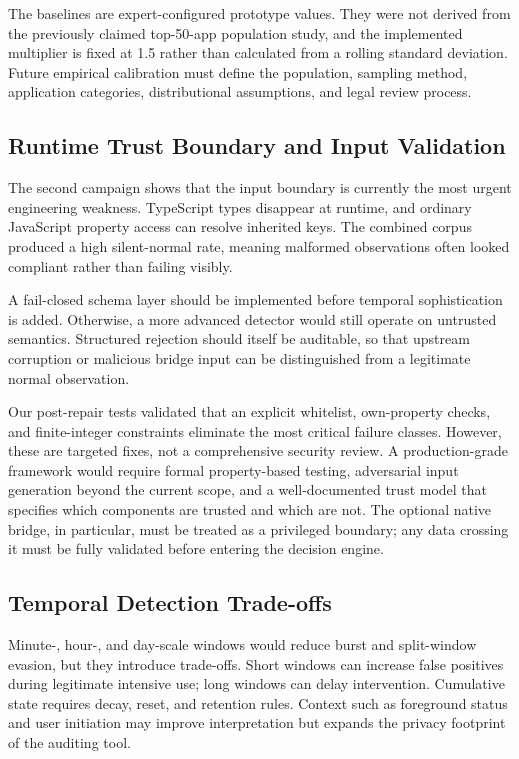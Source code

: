 The baselines are expert-configured prototype values. They were not derived from the previously claimed top-50-app population study, and the implemented multiplier is fixed at 1.5 rather than calculated from a rolling standard deviation. Future empirical calibration must define the population, sampling method, application categories, distributional assumptions, and legal review process.

\subsection{Runtime Trust Boundary and Input Validation}

The second campaign shows that the input boundary is currently the most urgent engineering weakness. TypeScript types disappear at runtime, and ordinary JavaScript property access can resolve inherited keys. The combined corpus produced a high silent-normal rate, meaning malformed observations often looked compliant rather than failing visibly.

A fail-closed schema layer should be implemented before temporal sophistication is added. Otherwise, a more advanced detector would still operate on untrusted semantics. Structured rejection should itself be auditable, so that upstream corruption or malicious bridge input can be distinguished from a legitimate normal observation.

Our post-repair tests validated that an explicit whitelist, own-property checks, and finite-integer constraints eliminate the most critical failure classes. However, these are targeted fixes, not a comprehensive security review. A production-grade framework would require formal property-based testing, adversarial input generation beyond the current scope, and a well-documented trust model that specifies which components are trusted and which are not. The optional native bridge, in particular, must be treated as a privileged boundary; any data crossing it must be fully validated before entering the decision engine.

\subsection{Temporal Detection Trade-offs}

Minute-, hour-, and day-scale windows would reduce burst and split-window evasion, but they introduce trade-offs. Short windows can increase false positives during legitimate intensive use; long windows can delay intervention. Cumulative state requires decay, reset, and retention rules. Context such as foreground status and user initiation may improve interpretation but expands the privacy footprint of the auditing tool.

